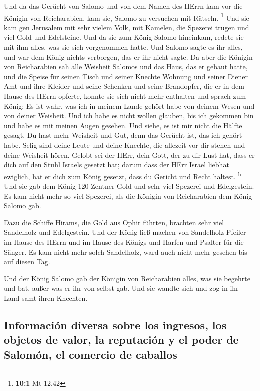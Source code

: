  Und da das Gerücht von Salomo und von dem Namen des HErrn
kam vor die Königin von Reicharabien, kam sie, Salomo zu versuchen mit
Rätseln. \footnote{\textbf{10:1} Mt 12,42}  Und sie kam
gen Jerusalem mit sehr vielem Volk, mit Kamelen, die Spezerei trugen und
viel Gold und Edelsteine. Und da sie zum König Salomo hineinkam, redete
sie mit ihm alles, was sie sich vorgenommen hatte.  Und
Salomo sagte es ihr alles, und war dem König nichts verborgen, das er
ihr nicht sagte.  Da aber die Königin von Reicharabien sah
alle Weisheit Salomos und das Haus, das er gebaut hatte, 
und die Speise für seinen Tisch und seiner Knechte Wohnung und seiner
Diener Amt und ihre Kleider und seine Schenken und seine Brandopfer, die
er in dem Hause des HErrn opferte, konnte sie sich nicht mehr enthalten
 und sprach zum König: Es ist wahr, was ich in meinem
Lande gehört habe von deinem Wesen und von deiner Weisheit.
 Und ich habe es nicht wollen glauben, bis ich gekommen
bin und habe es mit meinen Augen gesehen. Und siehe, es ist mir nicht
die Hälfte gesagt. Du hast mehr Weisheit und Gut, denn das Gerücht ist,
das ich gehört habe.  Selig sind deine Leute und deine
Knechte, die allezeit vor dir stehen und deine Weisheit hören.
 Gelobt sei der HErr, dein Gott, der zu dir Lust hat, dass
er dich auf den Stuhl Israels gesetzt hat; darum dass der HErr Israel
liebhat ewiglich, hat er dich zum König gesetzt, dass du Gericht und
Recht haltest. \textsuperscript{b}  Und sie gab dem König
120 Zentner Gold und sehr viel Spezerei und Edelgestein. Es kam nicht
mehr so viel Spezerei, als die Königin von Reicharabien dem König Salomo
gab.

 Dazu die Schiffe Hirams, die Gold aus Ophir führten,
brachten sehr viel Sandelholz und Edelgestein.  Und der
König ließ machen von Sandelholz Pfeiler im Hause des HErrn und im Hause
des Königs und Harfen und Psalter für die Sänger. Es kam nicht mehr
solch Sandelholz, ward auch nicht mehr gesehen bis auf diesen Tag.

 Und der König Salomo gab der Königin von Reicharabien
alles, was sie begehrte und bat, außer was er ihr von selbst gab. Und
sie wandte sich und zog in ihr Land samt ihren Knechten.

\hypertarget{informaciuxf3n-diversa-sobre-los-ingresos-los-objetos-de-valor-la-reputaciuxf3n-y-el-poder-de-salomuxf3n-el-comercio-de-caballos}{%
\subsection{Información diversa sobre los ingresos, los objetos de
valor, la reputación y el poder de Salomón, el comercio de
caballos}\label{informaciuxf3n-diversa-sobre-los-ingresos-los-objetos-de-valor-la-reputaciuxf3n-y-el-poder-de-salomuxf3n-el-comercio-de-caballos}}

